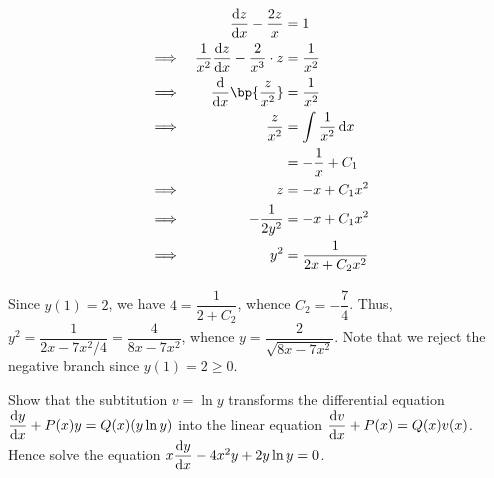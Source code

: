 \documentclass{echw}
\begin{document}
        \part
            {\allowdisplaybreaks
            \begin{alignat*}{2}
                && \der{z}{x} - \dfrac{2z}{x} &= 1\\
                \implies&& \dfrac1{x^2} \der{z}{x} - \dfrac{2}{x^3} \cdot z &= \dfrac{1}{x^2} \\
                \implies&& \der{}{x} \bp{\dfrac{z}{x^2}} &= \dfrac{1}{x^2}\\
                \implies&& \dfrac{z}{x^2} &= \int \dfrac{1}{x^2} \d x\\
                && &= -\dfrac{1}{x} + C_1\\
                \implies&& z &= -x + C_1x^2 \\
                \implies&& -\dfrac1{2y^2} &= -x + C_1x^2\\
                \implies&& y^2 &= \dfrac1{2x + C_2 x^2}
            \end{alignat*}}
            Since $y(1) = 2$, we have $4 = \dfrac1{2 + C_2}$, whence $C_2 = -\dfrac74$. Thus, $y^2 = \dfrac1{2x - 7x^2/4} = \dfrac{4}{8x - 7x^2}$, whence $y = \dfrac2{\sqrt{8x-7x^2}}$. Note that we reject the negative branch since $y(1) = 2 \geq 0$.


    \problem{}
        Show that the subtitution $v = \ln y$ transforms the differential equation $\dfrac{\mathrm{d} y}{\mathrm{d} x} + P(x) y = Q(x) (y \ln y)$ into the linear equation $\dfrac{\mathrm{d} v}{\mathrm{d} x} + P(x) = Q(x)v(x)$. Hence solve the equation $x \dfrac{\mathrm{d} y}{\mathrm{d} x} - 4x^2 y + 2y \ln y = 0$.
\end{document}
